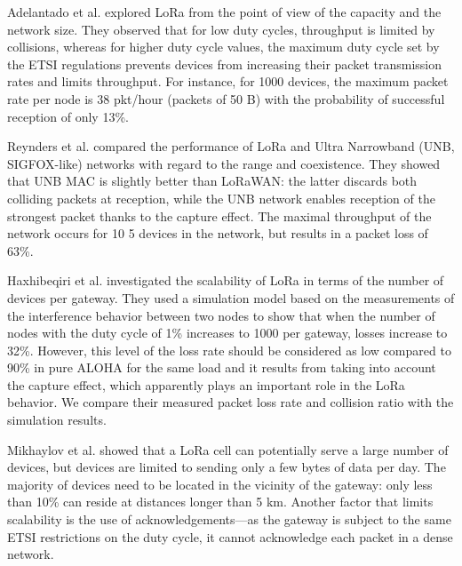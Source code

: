 Adelantado et al.
\cite{adelantado_understanding_2017} explored LoRa from the point of view of the capacity and the network size.
They observed that for low duty cycles,
	throughput is limited by collisions,
	whereas for higher duty cycle values,
	the maximum duty cycle set by the ETSI regulations prevents devices from increasing their packet transmission rates and limits throughput.
For instance,
	for 1000 devices,
	the maximum packet rate per node is 38 pkt/hour (packets of 50 B) with the probability of successful reception of only 13\%.

Reynders et al.
\cite{reynders_range_2016} compared the performance of LoRa and Ultra Narrowband (UNB,
	SIGFOX-like) networks with regard to the range and coexistence.
They showed that UNB MAC is slightly better than LoRaWAN:
	the latter discards both colliding packets at reception,
	while the UNB network enables reception of the strongest packet thanks to the capture effect.
The maximal throughput of the network occurs for 10 5 devices in the network,
	but results in a packet loss of 63\%.

Haxhibeqiri et al.
\cite{jetmir_haxhibeqiri_lora_2017} investigated the scalability of LoRa in terms of the number of devices per gateway.
They used a simulation model based on the measurements of the interference behavior between two nodes to show that when the number of nodes with the duty cycle of 1\% increases to 1000 per gateway,
losses increase to 32\%.
However,
	this level of the loss rate should be considered as low compared to 90\% in pure ALOHA
for the same load and it results from taking into account the capture effect,
	which apparently plays an important role in the LoRa behavior.
We compare their measured packet loss rate and collision ratio with the simulation results.

Mikhaylov et al.
\cite{mikhaylov_analysis_2016} showed that a LoRa cell can potentially serve a large number of devices,
	but devices are limited to sending only a few bytes of data per day.
The majority of devices need to be located in the vicinity of the gateway:
	only less than 10\% can reside at distances longer
than 5 km.
Another factor that limits scalability is the use of acknowledgements—as the gateway is subject to the same ETSI restrictions on the duty cycle,
	it cannot acknowledge each packet in a dense network.

